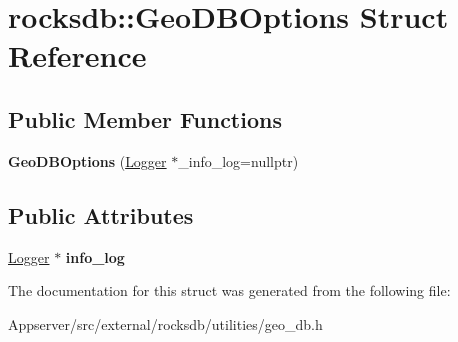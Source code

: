 \hypertarget{structrocksdb_1_1GeoDBOptions}{}\section{rocksdb\+:\+:Geo\+D\+B\+Options Struct Reference}
\label{structrocksdb_1_1GeoDBOptions}
\subsection*{Public Member Functions}
\begin{DoxyCompactItemize}
\item 
{\bfseries Geo\+D\+B\+Options} (\hyperlink{classrocksdb_1_1Logger}{Logger} $\ast$\+\_\+info\+\_\+log=nullptr)\hypertarget{structrocksdb_1_1GeoDBOptions_aae681ac7e6c94b79d597b86124ddea05}{}\label{structrocksdb_1_1GeoDBOptions_aae681ac7e6c94b79d597b86124ddea05}

\end{DoxyCompactItemize}
\subsection*{Public Attributes}
\begin{DoxyCompactItemize}
\item 
\hyperlink{classrocksdb_1_1Logger}{Logger} $\ast$ {\bfseries info\+\_\+log}\hypertarget{structrocksdb_1_1GeoDBOptions_aa26d74928c41e8bdfe2f52b1f1b7e3c4}{}\label{structrocksdb_1_1GeoDBOptions_aa26d74928c41e8bdfe2f52b1f1b7e3c4}

\end{DoxyCompactItemize}


The documentation for this struct was generated from the following file\+:\begin{DoxyCompactItemize}
\item 
Appserver/src/external/rocksdb/utilities/geo\+\_\+db.\+h\end{DoxyCompactItemize}
